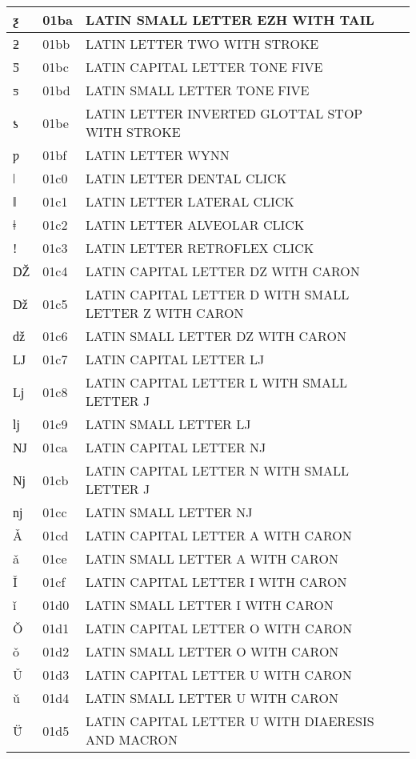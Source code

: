 \documentclass[12pt,letterpaper,openany]{book}
\begin{document}
\begin{center}
\begin{supertabular}{|m{0.25in}|m{0.5in}|m{4in}|}
			ƺ & 01ba & LATIN SMALL LETTER EZH WITH TAIL\\\hline
			ƻ & 01bb & LATIN LETTER TWO WITH STROKE\\\hline
			Ƽ & 01bc & LATIN CAPITAL LETTER TONE FIVE\\\hline
			ƽ & 01bd & LATIN SMALL LETTER TONE FIVE\\\hline
			ƾ & 01be & LATIN LETTER INVERTED GLOTTAL STOP WITH STROKE\\\hline
			ƿ & 01bf & LATIN LETTER WYNN\\\hline
			ǀ & 01c0 & LATIN LETTER DENTAL CLICK\\\hline
			ǁ & 01c1 & LATIN LETTER LATERAL CLICK\\\hline
			ǂ & 01c2 & LATIN LETTER ALVEOLAR CLICK\\\hline
			ǃ & 01c3 & LATIN LETTER RETROFLEX CLICK\\\hline
			Ǆ & 01c4 & LATIN CAPITAL LETTER DZ WITH CARON\\\hline
			ǅ & 01c5 & LATIN CAPITAL LETTER D WITH SMALL LETTER Z WITH CARON\\\hline
			ǆ & 01c6 & LATIN SMALL LETTER DZ WITH CARON\\\hline
			Ǉ & 01c7 & LATIN CAPITAL LETTER LJ\\\hline
			ǈ & 01c8 & LATIN CAPITAL LETTER L WITH SMALL LETTER J\\\hline
			ǉ & 01c9 & LATIN SMALL LETTER LJ\\\hline
			Ǌ & 01ca & LATIN CAPITAL LETTER NJ\\\hline
			ǋ & 01cb & LATIN CAPITAL LETTER N WITH SMALL LETTER J\\\hline
			ǌ & 01cc & LATIN SMALL LETTER NJ\\\hline
			Ǎ & 01cd & LATIN CAPITAL LETTER A WITH CARON\\\hline
			ǎ & 01ce & LATIN SMALL LETTER A WITH CARON\\\hline
			Ǐ & 01cf & LATIN CAPITAL LETTER I WITH CARON\\\hline
			ǐ & 01d0 & LATIN SMALL LETTER I WITH CARON\\\hline
			Ǒ & 01d1 & LATIN CAPITAL LETTER O WITH CARON\\\hline
			ǒ & 01d2 & LATIN SMALL LETTER O WITH CARON\\\hline
			Ǔ & 01d3 & LATIN CAPITAL LETTER U WITH CARON\\\hline
			ǔ & 01d4 & LATIN SMALL LETTER U WITH CARON\\\hline
			Ǖ & 01d5 & LATIN CAPITAL LETTER U WITH DIAERESIS AND MACRON\\\hline

\end{supertabular}
\end{center}
\end{document}
